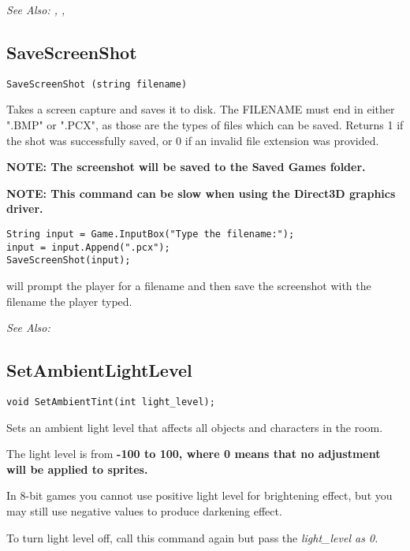 \it{See Also:} , , 


\subsection{SaveScreenShot}\label{SaveScreenShot}%

\begin{verbatim}
SaveScreenShot (string filename)
\end{verbatim}
Takes a screen capture and saves it to disk. The FILENAME must end in
either ".BMP" or ".PCX", as those are the types of files which can be saved.
Returns 1 if the shot was successfully saved, or 0 if an invalid file
extension was provided.

\bf{NOTE:} The screenshot will be saved to the Saved Games folder.

\bf{NOTE:} This command can be slow when using the Direct3D graphics driver.

\begin{verbatim}
String input = Game.InputBox("Type the filename:");
input = input.Append(".pcx");
SaveScreenShot(input);
\end{verbatim}
will prompt the player for a filename and then save the screenshot with the filename the player typed.

\it{See Also:} 


\subsection{SetAmbientLightLevel}\label{SetAmbientLightLevel}%

\begin{verbatim}
void SetAmbientTint(int light_level);
\end{verbatim}

Sets an ambient light level that affects all objects and characters in the room.

The light level is from \bf{-100 to 100}, where 0 means that no adjustment will be
applied to sprites.

In 8-bit games you cannot use positive light level for brightening effect, but you
may still use negative values to produce darkening effect.

To turn light level off, call this command again but pass the \it{light_level} as 0.

